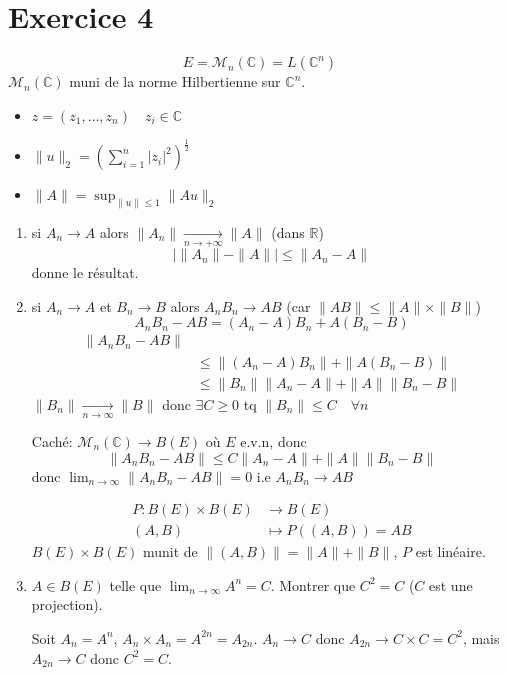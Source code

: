 \documentclass[a4paper]{article}
\newcommand{\R}{\mathbb{R}}
\begin{document}
\section*{Exercice 4}
\[
    E = \mathcal{M}_n(\mathbb{C}) = L(\mathbb{C}^n)
\] 
$\mathcal{M}_n(\mathbb{C})$ muni de la norme Hilbertienne sur $\mathbb{C}^n$.
\begin{itemize}
    \item $z = (z_1, \ldots, z_n) \quad z_i \in \mathbb{C}$
    \item $\|u\|_2 = \left( \sum_{i=1}^{n} |z_i|^2 \right)^{\frac{1}{2}}$
    \item $\|A\| = \sup_{\|u\| \le 1} \|Au\|_2$
\end{itemize}
\begin{enumerate}
    \item si $A_n \to A$ alors $\|A_n\| \xrightarrow[n \to +\infty]{} \|A\|$ (dans $\R$)
        \[
        \left| \|A_n\| - \|A\| \right| \le \|A_n - A\|
        \] 
        donne le résultat.
    \item si $A_n \to A$ et $B_n \to B$ alors $A_nB_n \to AB$ (car $\|AB\| \le \|A\|\times \|B\|$)
        \[
        A_nB_n - AB = (A_n - A)B_n + A(B_n - B)
        \] 
        \begin{align*}
            \|A_nB_n - AB\| & \\
                            &\le  \|(A_n - A)B_n\| + \|A(B_n - B)\|\\
                            &\le \|B_n\|\|A_n - A\| + \|A\|\|B_n - B\|
        \end{align*}
        $\|B_n\| \xrightarrow[n \to \infty]{} \|B\|$ donc $\exists C \ge 0$ tq $\|B_n\| \le C \quad \forall n$
        \par
        Caché: $\mathcal{M}_n(\mathbb{C}) \to B(E)$ où $E$ e.v.n, donc
         \[
        \|A_nB_n - AB\| \le C\|A_n - A\| + \|A\|\|B_n - B\|
        \] 
        donc $\lim_{n \to \infty} \|A_nB_n - AB\| = 0$ i.e $A_nB_n \to AB$

        \begin{align*}
            P: B(E) \times B(E) &\longrightarrow B(E) \\
            (A, B) &\longmapsto P((A, B)) = AB
        \end{align*}
        $B(E) \times B(E)$ munit de $\|(A,B)\| = \|A\| + \|B\|$,  $P$ est linéaire.
    \item  $A \in B(E)$ telle que $\lim_{n \to \infty} A^n = C$. Montrer que $C^2 = C$ ($C$ est une projection).
        \par
        Soit $A_n = A^n$,  $A_n \times A_n = A^{2n} = A_{2n}$. $A_n \to C$ donc $A_{2n} \to  C \times C = C^2$, mais $A_{2n} \to C$ donc $C^2 = C$.
\end{enumerate}
\end{document}

